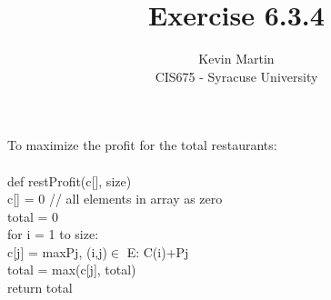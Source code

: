 \documentclass{article}
\author{Kevin Martin\\ CIS675 - Syracuse University}
\title{Exercise 6.3.4}
\newcommand\tab[1][1cm]{\hspace*{#1}}
\begin{document}
\maketitle
To maximize the profit for the total restaurants:\\\\

def restProfit(c[], size)\\
\tab c[] = 0 // all elements in array as zero\\
\tab total = 0\\
\tab for i = 1 to size:\\
\tab \tab c[j] = max{Pj, (i,j)$\in$ E: C(i)+Pj}\\
\tab \tab total = max(c[j], total)\\
\tab return total
\end{document}
